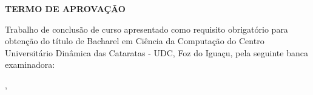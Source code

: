 \begin{folhadeaprovacao}
\begin{center}
	\vspace*{1cm}  
  	\large\textbf{TERMO DE APROVAÇÃO}
  	
  	\vspace*{1cm}
  	{\large\textbf\imprimirautor}

   \vspace*{1cm}
    {\large\textbf\imprimirtitulo}   
 \end{center}     
  
	
	\hspace{.4\textwidth}
	\SingleSpace\noindent\normalsize{Trabalho de conclusão de curso apresentado como requisito obrigatório para obtenção do título de Bacharel em Ciência da Computação do Centro Universitário Dinâmica das Cataratas - UDC, Foz do Iguaçu, pela seguinte banca examinadora:}
   
    
   \vspace*{0.5cm}  %
   \vspace*{2.5cm}
   \begin{center}
   	{\imprimirlocal, \ \imprimirdata}
   \end{center}
   
 
\end{folhadeaprovacao}